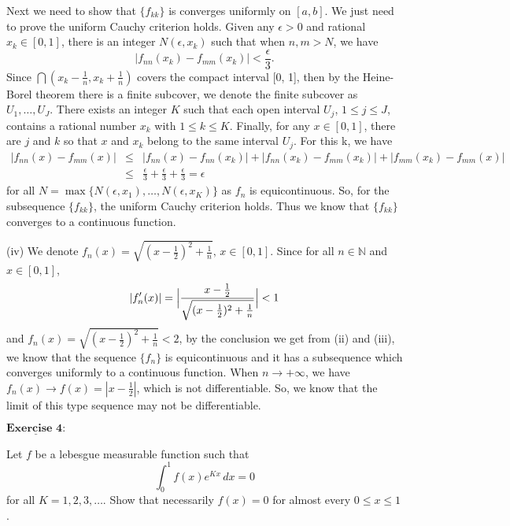 \documentclass[12pt,a4paper]{ctexart}
\begin{document}
Next we need to show that $\{f_{kk}\}$ is converges uniformly on $[a, b]$. We just need to prove the uniform Cauchy criterion holds. Given any $\epsilon > 0$ and rational $x_{k} \in [0, 1]$, there is an integer $N(\epsilon, x_{k})$ such that when $n, m > N$, we have
\begin{equation*}
   |f_{nn}(x_{k}) - f_{mm}(x_{k})| < \frac{\epsilon}{3}.
\end{equation*}
Since $\bigcap (x_{k} - \frac{1}{n}, x_{k} + \frac{1}{n})$ covers the compact interval [0, 1], then by the Heine-Borel theorem there is a finite subcover, we denote the finite subcover as $U_{1}, \dots, U_{J}$. There exists an integer $K$ such that each open interval $U_{j}$, $1 \leq j \leq J$, contains a rational number $x_{k}$ with $1 \leq k \leq K$. Finally, for any $x \in [0, 1]$, there are $j$ and $k$ so that $x$ and $x_{k}$ belong to the same interval $U_{j}$. For this k, we have
\begin{eqnarray*}
|f_{nn}(x) - f_{mm}(x)| & \leq & |f_{nn}(x) - f_{nn}(x_{k})| + |f_{nn}(x_{k}) - f_{mm}(x_{k})| + |f_{mm}(x_{k}) - f_{mm}(x)| \\
& \leq & \frac{\epsilon}{3} + \frac{\epsilon}{3} + \frac{\epsilon}{3} = \epsilon
\end{eqnarray*}
for all $ N = \max\{N(\epsilon,x_{1}), \dots, N(\epsilon,x_{K})\}$ as $f_{n}$ is equicontinuous. So, for the subsequence $\{f_{kk}\}$, the uniform Cauchy criterion holds. Thus we know that $\{f_{kk}\}$ converges to a continuous function.



(iv) We denote $f_{n} (x) = \sqrt{(x - \frac{1}{2})^{2} + \frac{1}{n}}, \, x \in [0, 1]$. Since for all $n \in \mathbb{N}$ and $x \in [0, 1]$,
\begin{equation*}
   |f'_{n}(x)| = \Big{|} \frac{x - \frac{1}{2}}{\sqrt{(x - \frac{1}{2})^{2} + \frac{1}{n}}} \Big{|} < 1
\end{equation*}
and $f_{n} (x) = \sqrt{(x - \frac{1}{2})^{2} + \frac{1}{n}} < 2$, by the conclusion we get from (ii) and (iii), we know that the sequence $\{f_{n}\}$ is equicontinuous and it has a subsequence which converges uniformly to a continuous function. When $n \to + \infty$, we have $f_{n}(x) \to f(x) = |x - \frac{1}{2}|$, which is not differentiable. So, we know that the limit of this type sequence may not be differentiable.

\newpage

$\underline{\textbf{Exercise 4:}}$

Let $f$ be a lebesgue measurable function such that 
\begin{equation*}
   \int_{0}^{1} f(x) e^{Kx} \, d x = 0
\end{equation*}
for all $K = 1, 2, 3, \dots$. Show that necessarily $f(x) = 0$ for almost every $0 \leq x \leq 1$. 
\end{document}

